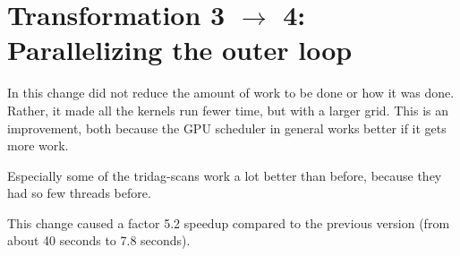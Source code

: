 \section{Transformation 3 $\rightarrow$ 4: Parallelizing the outer loop}

In this change did not reduce the amount of work to be done or how it
was done. Rather, it made all the kernels run fewer time, but with a
larger grid. This is an improvement, both because the GPU scheduler
in general works better if it gets more work.

Especially some of the tridag-scans work a lot better than before,
because they had so few threads before.

This change caused a factor 5.2 speedup compared to the previous version
(from about 40 seconds to 7.8 seconds).
